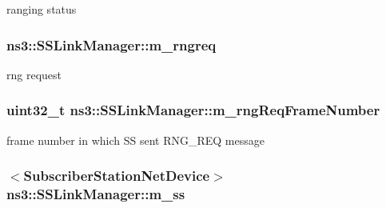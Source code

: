 ranging status 

\subsubsection[{\texorpdfstring{m\+\_\+rngreq}{m_rngreq}}]{ ns3\+::\+S\+S\+Link\+Manager\+::m\+\_\+rngreq\hspace{0.3cm}{\ttfamily [private]}}\hypertarget{classns3_1_1SSLinkManager_a3529ea909c47514bd720211fb5bb3702}{}\label{classns3_1_1SSLinkManager_a3529ea909c47514bd720211fb5bb3702}


rng request 

\subsubsection[{\texorpdfstring{m\+\_\+rng\+Req\+Frame\+Number}{m_rngReqFrameNumber}}]{\setlength{\rightskip}{0pt plus 5cm}uint32\+\_\+t ns3\+::\+S\+S\+Link\+Manager\+::m\+\_\+rng\+Req\+Frame\+Number\hspace{0.3cm}{\ttfamily [private]}}\hypertarget{classns3_1_1SSLinkManager_aa1819c668290b52001071139ed22374a}{}\label{classns3_1_1SSLinkManager_aa1819c668290b52001071139ed22374a}


frame number in which SS sent R\+N\+G\+\_\+\+R\+EQ message 

\subsubsection[{\texorpdfstring{m\+\_\+ss}{m_ss}}]{$<${\bf Subscriber\+Station\+Net\+Device}$>$ ns3\+::\+S\+S\+Link\+Manager\+::m\+\_\+ss\hspace{0.3cm}{\ttfamily [private]}}\hypertarget{classns3_1_1SSLinkManager_a44506c63befdc33eb0e0b4ba7f93d498}{}\label{classns3_1_1SSLinkManager_a44506c63befdc33eb0e0b4ba7f93d498}


